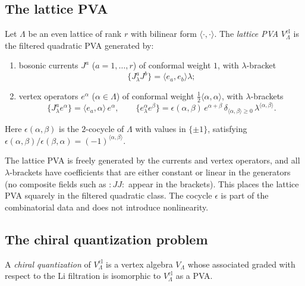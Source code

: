 \subsection{The lattice PVA}

\begin{definition}
Let $\Lambda$ be an even lattice of rank $r$ with bilinear form
$\langle\cdot,\cdot\rangle$. The \emph{lattice PVA}
$V_\Lambda^{\mathrm{cl}}$ is the filtered quadratic PVA generated by:
\begin{enumerate}[leftmargin=2.4em]
\item bosonic currents $J^a$ ($a = 1,\dots,r$) of conformal weight $1$,
with $\lambda$-bracket
\[
\{J^a_\lambda J^b\} = \langle e_a, e_b\rangle \lambda;
\]
\item vertex operators $e^\alpha$ ($\alpha \in \Lambda$) of conformal
weight $\frac{1}{2}\langle\alpha,\alpha\rangle$, with $\lambda$-brackets
\[
\{J^a_\lambda e^\alpha\} = \langle e_a, \alpha\rangle\, e^\alpha,
\qquad
\{e^\alpha_\lambda e^\beta\} = \epsilon(\alpha,\beta)\, e^{\alpha+\beta}\,
\delta_{\langle\alpha,\beta\rangle \ge 0}\, \lambda^{\langle\alpha,\beta\rangle}.
\]
\end{enumerate}
Here $\epsilon(\alpha,\beta)$ is the $2$-cocycle of $\Lambda$ with values
in $\{\pm 1\}$, satisfying
$\epsilon(\alpha,\beta)/\epsilon(\beta,\alpha) = (-1)^{\langle\alpha,\beta\rangle}$.
\end{definition}

\begin{remark}
The lattice PVA is freely generated by the currents and vertex operators,
and all $\lambda$-brackets have coefficients that are either constant or
linear in the generators (no composite fields such as ${:}JJ{:}$ appear
in the brackets). This places the lattice PVA squarely in the filtered
quadratic class. The cocycle $\epsilon$ is part of the combinatorial data
and does not introduce nonlinearity.
\end{remark}

\subsection{The chiral quantization problem}

\begin{definition}
A \emph{chiral quantization} of $V_\Lambda^{\mathrm{cl}}$ is a vertex algebra
$V_\Lambda$ whose associated graded with respect to the Li filtration
is isomorphic to $V_\Lambda^{\mathrm{cl}}$ as a PVA.
\end{definition}

